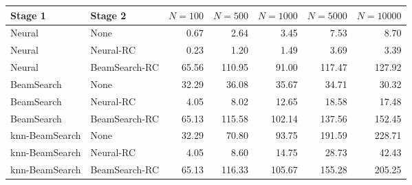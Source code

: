 \begin{tabular}{llrrrrr}
\hline
Stage 1 & Stage 2 & $N=100$ & $N=500$ & $N=1000$ & $N=5000$ & $N=10000$ \\
\hline
Neural & None & 0.67 & 2.64 & 3.45 & 7.53 & 8.70 \\
Neural & Neural-RC & 0.23 & 1.20 & 1.49 & 3.69 & 3.39 \\
Neural & BeamSearch-RC & 65.56 & 110.95 & 91.00 & 117.47 & 127.92 \\
BeamSearch & None & 32.29 & 36.08 & 35.67 & 34.71 & 30.32 \\
BeamSearch & Neural-RC & 4.05 & 8.02 & 12.65 & 18.58 & 17.48 \\
BeamSearch & BeamSearch-RC & 65.13 & 115.58 & 102.14 & 137.56 & 152.45 \\
knn-BeamSearch & None & 32.29 & 70.80 & 93.75 & 191.59 & 228.71 \\
knn-BeamSearch & Neural-RC & 4.05 & 8.60 & 14.75 & 28.73 & 42.43 \\
knn-BeamSearch & BeamSearch-RC & 65.13 & 116.33 & 105.67 & 155.28 & 205.25 \\
\hline
\end{tabular}
